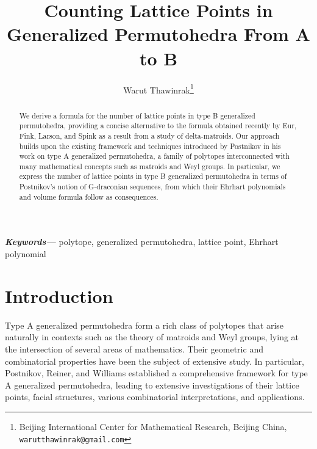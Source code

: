 \documentclass[12pt,reqno]{article}%
\title{Counting Lattice Points in Generalized Permutohedra From A to B}
\author{Warut Thawinrak\thanks{Beijing International Center for Mathematical Research, Beijing China, \texttt{warutthawinrak@gmail.com}}}
\date{}
\theoremstyle{definition}
\numberwithin{equation}{section}
\providecommand{\keywords}[1]
{
  \small	
  \textbf{\textit{Keywords---}} #1
}
\begin{document}
\maketitle
\thispagestyle{empty}

\begin{abstract}
    We derive a formula for the number of lattice points in type B generalized permutohedra, providing a concise alternative to the formula obtained recently by Eur, Fink, Larson, and Spink as a result from a study of delta-matroids. Our approach builds upon the existing framework and techniques introduced by Postnikov in his work on type A generalized permutohedra, a family of polytopes interconnected with many mathematical concepts such as matroids and Weyl groups. In particular, we express the number of lattice points in type B generalized permutohedra in terms of Postnikov’s notion of G-draconian sequences, from which their Ehrhart polynomials and volume formula follow as consequences.
\end{abstract}

\keywords{polytope, generalized permutohedra, lattice point, Ehrhart polynomial}


\section{Introduction}

Type A generalized permutohedra form a rich class of polytopes that arise naturally in contexts such as the theory of matroids and Weyl groups, lying at the intersection of several areas of mathematics. Their geometric and combinatorial properties have been the subject of extensive study. In particular, Postnikov, Reiner, and Williams \cite{Postnikov2005, PostnikovEtal2008} established a comprehensive framework for type A generalized permutohedra, leading to extensive investigations of their lattice points, facial structures, various combinatorial interpretations, and applications. 
\end{document}
